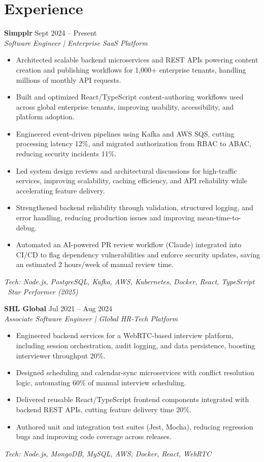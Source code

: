 \documentclass[a4paper,10.5pt]{article}
\begin{document}
\section{Experience}

\textbf{Simpplr} \hfill Sept 2024 -- Present \\
\textit{Software Engineer | Enterprise SaaS Platform}
\begin{itemize}
  \item Architected scalable backend microservices and REST APIs powering content creation and publishing workflows for 1,000+ enterprise tenants, handling millions of monthly API requests.
  \item Built and optimized React/TypeScript content-authoring workflows used across global enterprise tenants, improving usability, accessibility, and platform adoption.
  \item Engineered event-driven pipelines using Kafka and AWS SQS, cutting processing latency 12\%, and migrated authorization from RBAC to ABAC, reducing security incidents 11\%.
  \item Led system design reviews and architectural discussions for high-traffic services, improving scalability, caching efficiency, and API reliability while accelerating feature delivery.
  \item Strengthened backend reliability through validation, structured logging, and error handling, reducing production issues and improving mean-time-to-debug.
  \item Automated an AI-powered PR review workflow (Claude) integrated into CI/CD to flag dependency vulnerabilities and enforce security updates, saving an estimated 2 hours/week of manual review time.
\end{itemize}
\textit{Tech: Node.js, PostgreSQL, Kafka, AWS, Kubernetes, Docker, React, TypeScript \textbar\ Star Performer (2025)}

\textbf{SHL Global} \hfill Jul 2021 -- Aug 2024 \\
\textit{Associate Software Engineer | Global HR-Tech Platform}
\begin{itemize}
  \item Engineered backend services for a WebRTC-based interview platform, including session orchestration, audit logging, and data persistence, boosting interviewer throughput 20\%.
  \item Designed scheduling and calendar-sync microservices with conflict resolution logic, automating 60\% of manual interview scheduling.
  \item Delivered reusable React/TypeScript frontend components integrated with backend REST APIs, cutting feature delivery time 20\%.
  \item Authored unit and integration test suites (Jest, Mocha), reducing regression bugs and improving code coverage across releases.
\end{itemize}
\textit{Tech: Node.js, MongoDB, MySQL, AWS, Docker, React, WebRTC}
\end{document}
